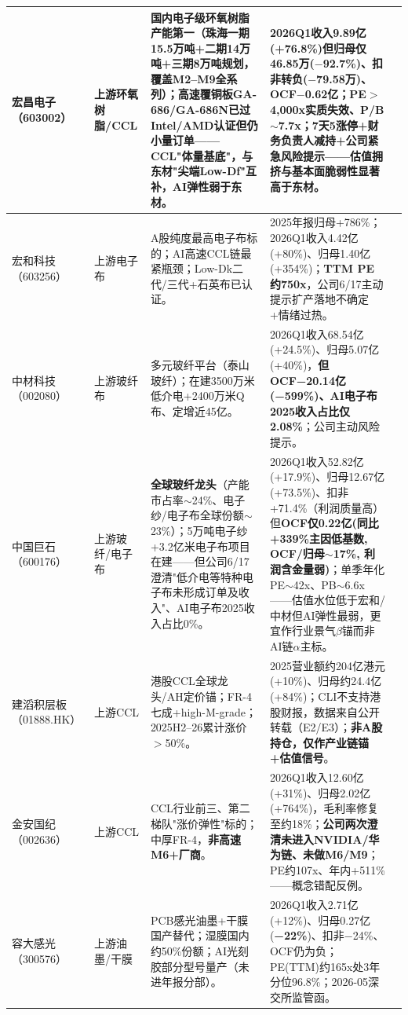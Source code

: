 \begin{exhibitbox}[图表6-2：产业链扩充标的短卡片]
\begin{tabularx}{\textwidth}{L{2.0cm}L{1.4cm}L{1.6cm}X L{1.9cm}}
\midrule
宏昌电子（603002） & 上游环氧树脂/CCL & \textbf{国内电子级环氧树脂产能第一}（珠海一期15.5万吨+二期14万吨+三期8万吨规划，覆盖M2--M9全系列）；高速覆铜板GA-686/GA-686N已过Intel/AMD认证但仍小量订单——CCL"体量基底"，与东材"尖端Low-Df"互补，AI弹性弱于东材。 & 2026Q1收入9.89亿(+76.8\%)但\textbf{归母仅46.85万($-$92.7\%)、扣非转负($-$79.58万)、OCF$-$0.62亿}；PE$>$4,000x实质失效、P/B$\sim$7.7x；7天5涨停+财务负责人减持+公司紧急风险提示——估值拥挤与基本面脆弱性显著高于东材。 &  \\
\midrule
宏和科技（603256） & 上游电子布 & A股纯度最高电子布标的；AI高速CCL链最紧瓶颈；Low-Dk二代/三代+石英布已认证。 & 2025年报归母+786\%；2026Q1收入4.42亿(+80\%)、归母1.40亿(+354\%)；\textbf{TTM PE约750x}，公司6/17主动提示扩产落地不确定+情绪过热。 &  \\
\midrule
中材科技（002080） & 上游玻纤布 & 多元玻纤平台（泰山玻纤）；在建3500万米低介电+2400万米Q布、定增近45亿。 & 2026Q1收入68.54亿(+24.5\%)、归母5.07亿(+40\%)，\textbf{但OCF−20.14亿(−599\%)、AI电子布2025收入占比仅2.08\%}；公司主动风险提示。 &  \\
\midrule
中国巨石（600176） & 上游玻纤/电子布 & \textbf{全球玻纤龙头}（产能市占率$\sim$24\%、电子纱/电子布全球份额$\sim$23\%）；5万吨电子纱+3.2亿米电子布项目在建——但公司6/17澄清"低介电等特种电子布未形成订单及收入"、AI电子布2025收入占比0\%。 & 2026Q1收入52.82亿(+17.9\%)、归母12.67亿(+73.5\%)、扣非+71.4\%（利润质量高）但\textbf{OCF仅0.22亿(同比+339\%主因低基数, OCF/归母$\sim$17\%, 利润含金量弱)}；单季年化PE$\sim$42x、PB$\sim$6.6x——估值水位低于宏和/中材但AI弹性最弱，更宜作行业景气$\beta$锚而非AI链$\alpha$主标。 &  \\
\midrule
建滔积层板（01888.HK） & 上游CCL & 港股CCL全球龙头/AH定价锚；FR-4七成+high-M-grade；2025H2--26累计涨价$>$50\%。 & 2025营业额约204亿港元(+10\%)、归母约24.4亿(+84\%)；CLI不支持港股财报，数据来自公开转载（E2/E3）；\textbf{非A股持仓，仅作产业链锚+估值信号}。 &  \\
\midrule
金安国纪（002636） & 上游CCL & CCL行业前三、第二梯队"涨价弹性"标的；中厚FR-4，\textbf{非高速M6+厂商}。 & 2026Q1收入12.60亿(+31\%)、归母2.02亿(+764\%)，毛利率修复至约18\%；\textbf{公司两次澄清未进入NVIDIA/华为链、未做M6/M9}；PE约107x、年内+511\%——概念错配反例。 &  \\
\midrule
容大感光（300576） & 上游油墨/干膜 & PCB感光油墨+干膜国产替代；湿膜国内约50\%份额；AI光刻胶部分型号量产（未进年报分部）。 & 2026Q1收入2.71亿(+12\%)、归母0.27亿(\textbf{−22\%})、扣非−24\%、OCF仍为负；PE(TTM)约165x处3年分位96.8\%；2026-05深交所监管函。 &  \\

\end{tabularx}
\end{exhibitbox}
